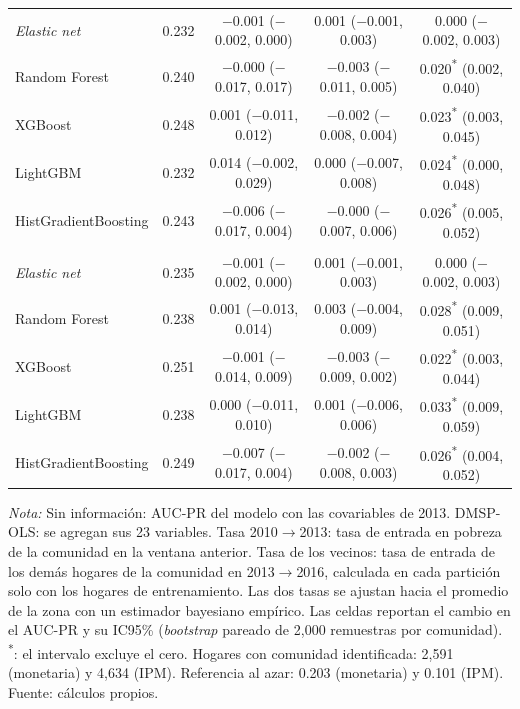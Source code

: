 \begin{table}[H]
\begin{tabular}{l c ccc}
    \quad \emph{Elastic net} & 0.232 & $-$0.001 ($-$0.002, 0.000) & 0.001 ($-$0.001, 0.003) & 0.000 ($-$0.002, 0.003) \\
    \quad Random Forest & 0.240 & $-$0.000 ($-$0.017, 0.017) & $-$0.003 ($-$0.011, 0.005) & 0.020\textsuperscript{*} (0.002, 0.040) \\
    \quad XGBoost & 0.248 & 0.001 ($-$0.011, 0.012) & $-$0.002 ($-$0.008, 0.004) & 0.023\textsuperscript{*} (0.003, 0.045) \\
    \quad LightGBM & 0.232 & 0.014 ($-$0.002, 0.029) & 0.000 ($-$0.007, 0.008) & 0.024\textsuperscript{*} (0.000, 0.048) \\
    \quad HistGradientBoosting & 0.243 & $-$0.006 ($-$0.017, 0.004) & $-$0.000 ($-$0.007, 0.006) & 0.026\textsuperscript{*} (0.005, 0.052) \\
    \addlinespace
    \multicolumn{5}{l}{\textit{IPM, con ingreso y gasto (Modelo A)}} \\
    \quad \emph{Elastic net} & 0.235 & $-$0.001 ($-$0.002, 0.000) & 0.001 ($-$0.001, 0.003) & 0.000 ($-$0.002, 0.003) \\
    \quad Random Forest & 0.238 & 0.001 ($-$0.013, 0.014) & 0.003 ($-$0.004, 0.009) & 0.028\textsuperscript{*} (0.009, 0.051) \\
    \quad XGBoost & 0.251 & $-$0.001 ($-$0.014, 0.009) & $-$0.003 ($-$0.009, 0.002) & 0.022\textsuperscript{*} (0.003, 0.044) \\
    \quad LightGBM & 0.238 & 0.000 ($-$0.011, 0.010) & 0.001 ($-$0.006, 0.006) & 0.033\textsuperscript{*} (0.009, 0.059) \\
    \quad HistGradientBoosting & 0.249 & $-$0.007 ($-$0.017, 0.004) & $-$0.002 ($-$0.008, 0.003) & 0.026\textsuperscript{*} (0.004, 0.052) \\
    \bottomrule
  \end{tabular}
  \begin{minipage}{0.95\textwidth}
    \vspace{4pt}
    \footnotesize \textit{Nota:} Sin información: AUC-PR del modelo con las covariables de
    2013. DMSP-OLS: se agregan sus 23 variables. Tasa 2010$\to$2013: tasa de entrada en
    pobreza de la comunidad en la ventana anterior. Tasa de los vecinos: tasa de entrada
    de los demás hogares de la comunidad en 2013$\to$2016, calculada en cada partición
    solo con los hogares de entrenamiento. Las dos tasas se ajustan hacia el promedio de
    la zona con un estimador bayesiano empírico. Las celdas reportan el cambio en el
    AUC-PR y su IC95\% (\emph{bootstrap} pareado de 2{,}000 remuestras por comunidad).
    \textsuperscript{*}: el intervalo excluye el cero. Hogares con comunidad
    identificada: 2{,}591 (monetaria) y 4{,}634 (IPM). Referencia al azar:
    0.203 (monetaria) y 0.101 (IPM).
    Fuente: cálculos propios.
  \end{minipage}
\end{table}
